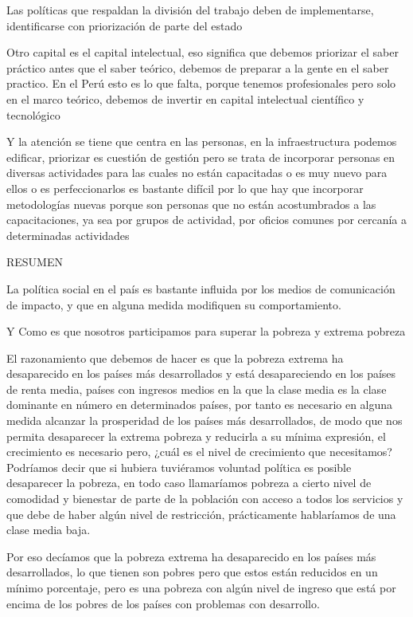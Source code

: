 \documentclass[
  a4paper,
]{article}
\begin{document}
Las políticas que respaldan la división del trabajo deben de
implementarse, identificarse con priorización de parte del estado

Otro capital es el capital intelectual, eso significa que debemos
priorizar el saber práctico antes que el saber teórico, debemos de
preparar a la gente en el saber practico. En el Perú esto es lo que
falta, porque tenemos profesionales pero solo en el marco teórico,
debemos de invertir en capital intelectual científico y tecnológico

Y la atención se tiene que centra en las personas, en la infraestructura
podemos edificar, priorizar es cuestión de gestión pero se trata de
incorporar personas en diversas actividades para las cuales no están
capacitadas o es muy nuevo para ellos o es perfeccionarlos es bastante
difícil por lo que hay que incorporar metodologías nuevas porque son
personas que no están acostumbrados a las capacitaciones, ya sea por
grupos de actividad, por oficios comunes por cercanía a determinadas
actividades

RESUMEN

La política social en el país es bastante influida por los medios de
comunicación de impacto, y que en alguna medida modifiquen su
comportamiento.

Y Como es que nosotros participamos para superar la pobreza y extrema
pobreza

El razonamiento que debemos de hacer es que la pobreza extrema ha
desaparecido en los países más desarrollados y está desapareciendo en
los países de renta media, países con ingresos medios en la que la clase
media es la clase dominante en número en determinados países, por tanto
es necesario en alguna medida alcanzar la prosperidad de los países más
desarrollados, de modo que nos permita desaparecer la extrema pobreza y
reducirla a su mínima expresión, el crecimiento es necesario pero, ¿cuál
es el nivel de crecimiento que necesitamos? Podríamos decir que si
hubiera tuviéramos voluntad política es posible desaparecer la pobreza,
en todo caso llamaríamos pobreza a cierto nivel de comodidad y bienestar
de parte de la población con acceso a todos los servicios y que debe de
haber algún nivel de restricción, prácticamente hablaríamos de una clase
media baja.

Por eso decíamos que la pobreza extrema ha desaparecido en los países
más desarrollados, lo que tienen son pobres pero que estos están
reducidos en un mínimo porcentaje, pero es una pobreza con algún nivel
de ingreso que está por encima de los pobres de los países con problemas
con desarrollo.
\end{document}
